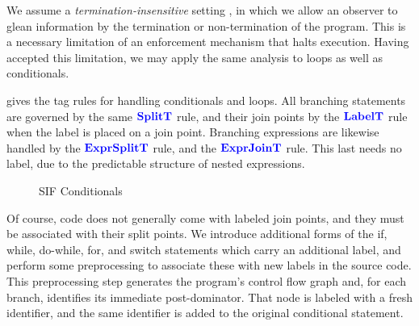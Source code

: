 \documentclass{llncs}
\begin{document}
We assume a {\em termination-insensitive} setting \cite{Askarov08:TINILeaks}, in which
we allow an observer to glean information by the termination or non-termination of
the program. This is a necessary limitation of an enforcement mechanism that halts
execution. Having accepted this limitation, we may apply the same analysis to loops
as well as conditionals.

 gives the tag rules for handling conditionals and loops.
All branching statements are governed by the same \(\color{blue} \mathbf{SplitT}\) rule, and their join points
by the \(\color{blue} \mathbf{LabelT}\) rule when the label is placed on a join point. Branching expressions
are likewise handled by the \(\color{blue} \mathbf{ExprSplitT}\) rule, and the \(\color{blue} \mathbf{ExprJoinT}\) rule.
This last needs no label, due to the predictable structure of nested expressions.

\begin{figure}
  \begin{minipage}{0.5\textwidth}
  \end{minipage}
  \begin{minipage}{0.49\textwidth}

  \end{minipage}
  
  \caption{SIF Conditionals}
  \label{fig:SIFconditional Rules}
\end{figure}

Of course, code does not generally come with labeled join points, and they must be associated
with their split points. We introduce additional forms of the if, while, do-while, for, and switch
statements which carry an additional label, and perform some preprocessing to associate these
with new labels in the source code. This preprocessing step generates the program's
control flow graph and, for each branch, identifies its immediate post-dominator. That
node is labeled with  a fresh identifier, and the same identifier is added to the original
conditional statement.
\end{document}
